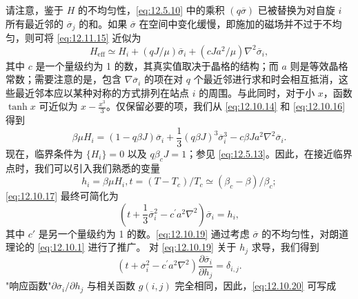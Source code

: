 请注意，鉴于 \(H\) 的不均匀性，\autoref{eq:12.5.10} 中的乘积 \((q\overline{\sigma})\) 已被替换为对自旋 \(i\) 所有最近邻的 \(\overline{\sigma}_j\) 的和。如果 \(\overline{\sigma}\) 在空间中变化缓慢，即施加的磁场并不过于不均匀，则可将 \autoref{eq:12.11.15} 近似为
\begin{equation}\tag{12.11.16}\label{eq:12.11.16}
H _ { \mathrm { e f f } } \simeq H _ { i } + ( q J / \mu ) \overline { { \sigma } } _ { i } + ( c J a ^{2} / \mu ) \nabla ^{2} \overline { { \sigma } } _ { i } ,
\end{equation}
其中 \(c\) 是一个量级约为 1 的数，其真实值取决于晶格的结构；而 \(a\) 则是等效晶格常数；需要注意的是，包含 \(\nabla\overline{\sigma}_{i}\) 的项在对 \(q\) 个最近邻进行求和时会相互抵消，这些最近邻本应以某种对称的方式排列在站点 \(i\) 的周围。与此同时，对于小 \(x\)，函数 \(\tanh x\) 可近似为 \(x - \frac{x^3}{3}\)。仅保留必要的项，我们从 \autoref{eq:12.10.14} 和 \autoref{eq:12.10.16} 得到
\begin{equation}\tag{12.11.17}\label{eq:12.11.17}
\beta \mu H _ { i } = ( 1 - q \beta J ) \overline { { \sigma } } _ { i } + \frac { 1 } { 3 } ( q \beta J ) ^{3} \overline { { \sigma } } _ { i } ^{3} - c \beta J a ^{2} \nabla ^{2} \overline { { \sigma } } _ { i } .
\end{equation}
现在，临界条件为 \(\{H_{i}\}=0\) 以及 \(q\beta_{c}J=1\)；参见 \autoref{eq:12.5.13}。因此，在接近临界点时，我们可以引入我们熟悉的变量
\begin{equation}\tag{12.11.18}\label{eq:12.11.18}
h _ { i } = \beta \mu H _ { i } ,  t = ( T - T _ { c } ) / T _ { c } \simeq ( \beta _ { c } - \beta ) / \beta _ { c } ;
\end{equation}
\autoref{eq:12.10.17} 最终可简化为
\begin{equation}\tag{12.11.19}\label{eq:12.11.19}
\left( t + \frac { 1 } { 3 } \overline { { \sigma } } _ { i } ^{2} - c ^{\prime} a ^{2} \nabla ^{2} \right) \overline { { \sigma } } _ { i } = h _ { i } ,
\end{equation}
其中 \(c'\) 是另一个量级约为 1 的数。\autoref{eq:12.10.19} 通过考虑 \(\overline{\sigma}\) 的不均匀性，对朗道理论的 \autoref{eq:12.10.1} 进行了推广。
对 \autoref{eq:12.10.19} 关于 \(h_{j}\) 求导，我们得到
\begin{equation}\tag{12.11.20}\label{eq:12.11.20}
\left( t + \overline { { \sigma } } _ { i } ^{2} - c ^{\prime} a ^{2} \nabla ^{2} \right) \frac { \partial \overline { { \sigma } } _ { i } } { \partial h _ { j } } = \delta _ { i , j } .
\end{equation}
"响应函数"\(\partial\overline{\sigma}_{i}/\partial h_{j}\) 与相关函数 \(g(i,j)\) 完全相同，因此，\autoref{eq:12.10.20} 可写成
